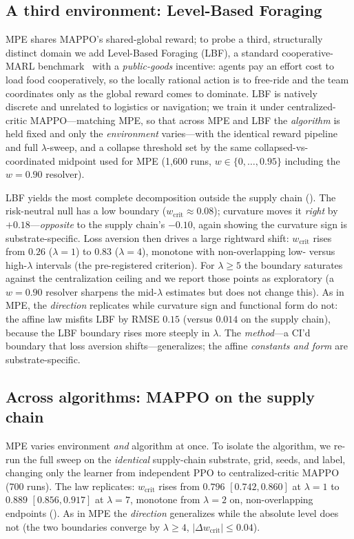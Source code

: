 \documentclass[letterpaper]{article}
\theoremstyle{plain}
\newcommand{\wcrit}{w_{\mathrm{crit}}}
\begin{document}
\subsection{A third environment: Level-Based Foraging}
\label{sec:lbf}
MPE shares MAPPO's shared-global reward; to probe a third, structurally distinct
domain we add Level-Based Foraging (LBF), a standard cooperative-MARL
benchmark~\citep{christianos2020shared} with a \emph{public-goods} incentive:
agents pay an effort cost to load food cooperatively, so the locally rational
action is to free-ride and the team coordinates only as the global reward comes
to dominate. LBF is natively discrete and unrelated to logistics or navigation;
we train it under centralized-critic MAPPO---matching MPE, so that across MPE and
LBF the \emph{algorithm} is held fixed and only the \emph{environment}
varies---with the identical reward pipeline and full $\lambda$-sweep, and a
collapse threshold set by the same collapsed-vs-coordinated midpoint used for MPE
(1{,}600 runs, $w\in\{0,\ldots,0.95\}$ including the $w{=}0.90$ resolver).

LBF yields the most complete decomposition outside the supply chain
(). The risk-neutral null has a low boundary
($\wcrit\approx0.08$); curvature moves it \emph{right} by $+0.18$---\emph{opposite}
to the supply chain's $-0.10$, again showing the curvature sign is
substrate-specific. Loss aversion then drives a large rightward shift: $\wcrit$
rises from $0.26$ ($\lambda{=}1$) to $0.83$ ($\lambda{=}4$), monotone with
non-overlapping low- versus high-$\lambda$ intervals (the pre-registered
criterion). For $\lambda{\geq}5$ the boundary saturates against the centralization
ceiling and we report those points as exploratory (a $w{=}0.90$ resolver sharpens
the mid-$\lambda$ estimates but does not change this). As in MPE, the
\emph{direction} replicates while curvature sign and functional form do not: the
affine law misfits LBF by RMSE $0.15$ (versus $0.014$ on the supply chain),
because the LBF boundary rises more steeply in $\lambda$. The \emph{method}---a
CI'd boundary that loss aversion shifts---generalizes; the affine \emph{constants
and form} are substrate-specific.

\subsection{Across algorithms: MAPPO on the supply chain}
\label{sec:appendix_crossalgo}

MPE varies environment \emph{and} algorithm at once. To isolate the algorithm, we
re-run the full sweep on the \emph{identical} supply-chain substrate, grid, seeds,
and label, changing only the learner from independent PPO to centralized-critic
MAPPO~\citep{yu2022surprising} (700 runs). The law replicates: $\wcrit$ rises from
$0.796$ $[0.742,0.860]$ at $\lambda{=}1$ to $0.889$ $[0.856,0.917]$ at
$\lambda{=}7$, monotone from $\lambda{=}2$ on, non-overlapping endpoints
(). As in MPE the \emph{direction} generalizes while the
absolute level does not (the two boundaries converge by $\lambda{\geq}4$,
$|\Delta\wcrit|\leq0.04$).
\end{document}
